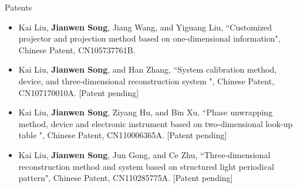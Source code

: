 \documentclass{resume} %
\begin{document}
\begin{rSection}{Patents}
\begin{itemize}[leftmargin=*]
	\item Kai Liu, {\bf Jianwen Song}, Jiang Wang, and Yiguang Liu, ``Customized projector and projection method based on one-dimensional information", Chinese Patent, CN105737761B.
	\item Kai Liu, {\bf Jianwen Song}, and Han Zhang, ``System calibration method, device, and three-dimensional reconstruction system ", Chinese Patent, CN107170010A. [Patent pending]
	\item Kai Liu, {\bf Jianwen Song}, Ziyang Hu, and Bin Xu, ``Phase unwrapping method, device and electronic instrument based on two-dimensional look-up table ", Chinese Patent, CN110006365A. [Patent pending]
	\item Kai Liu, {\bf Jianwen Song}, Jun Gong, and Ce Zhu, ``Three-dimensional reconstruction method and system based on structured light periodical pattern", Chinese Patent, CN110285775A. [Patent pending]
\end{itemize}
	
\end{rSection}

\end{document}
